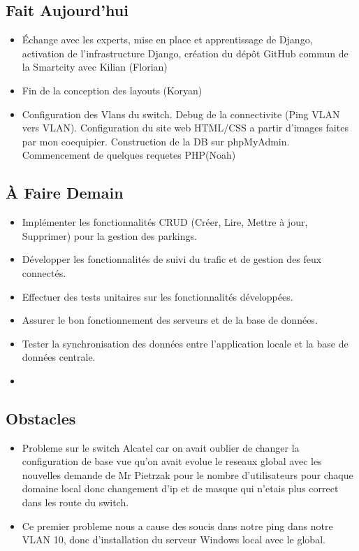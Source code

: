 \documentclass[a4paper,12pt]{report}
\begin{document}
\subsection{Fait Aujourd'hui}
\begin{itemize}
    \item Échange avec les experts, mise en place et apprentissage de Django, activation de l'infrastructure Django, création du dépôt GitHub commun de la Smartcity avec Kilian (Florian)
    \item Fin de la conception des layouts (Koryan)
    \item Configuration des Vlans du switch. Debug de la connectivite (Ping VLAN vers VLAN). Configuration du site web HTML/CSS a partir d'images faites par mon coequipier. Construction de la DB sur phpMyAdmin. Commencement de quelques requetes PHP(Noah)
\end{itemize}

\subsection{À Faire Demain}
\begin{itemize}
    \item Implémenter les fonctionnalités CRUD (Créer, Lire, Mettre à jour, Supprimer) pour la gestion des parkings.
    \item Développer les fonctionnalités de suivi du trafic et de gestion des feux connectés.
    \item Effectuer des tests unitaires sur les fonctionnalités développées.
    \item Assurer le bon fonctionnement des serveurs et de la base de données.
    \item Tester la synchronisation des données entre l'application locale et la base de données centrale.
    \item 
\end{itemize}

\subsection{Obstacles}

\begin{itemize}
    \item Probleme sur le switch Alcatel car on avait oublier de changer la configuration de base vue qu'on avait evolue le reseaux global avec les nouvelles demande de Mr Pietrzak pour le nombre d'utilisateurs pour chaque domaine local donc changement d'ip et de masque qui n'etais plus correct dans les route du switch.
    \item Ce premier probleme nous a cause des soucis dans notre ping dans notre VLAN 10, donc d'installation du serveur Windows local avec le global.
\end{itemize}
\end{document}
